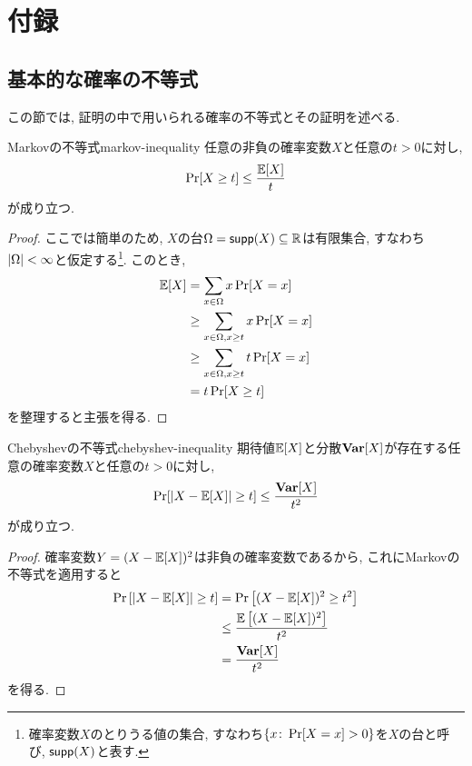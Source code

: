 \chapter{付録}

\section{基本的な確率の不等式}
この節では, 証明の中で用いられる確率の不等式とその証明を述べる.
\begin{lemma}{Markovの不等式}{markov-inequality}
  任意の非負の確率変数$X$と任意の$t>0$に対し,
  \begin{align*}
    \Pr[X\ge t] \le \frac{\operatorname*{\mathbb{E}}[X]}{t}
  \end{align*}
  が成り立つ.
\end{lemma}

\begin{proof}
  ここでは簡単のため, $X$の台$\Omega=\mathsf{supp}(X)\subseteq\mathbb{R}$は有限集合, すなわち$\abs{\Omega}<\infty$と仮定する\footnote{確率変数$X$のとりうる値の集合, すなわち$\qty{x\colon \Pr[X=x]>0}$を$X$の台と呼び, $\mathsf{supp}(X)$と表す.}.
  このとき,
  \begin{align*}
    \operatorname*{\mathbb{E}}[X] &= \sum_{x\in \Omega} x\Pr[X=x] \\
    &\ge \sum_{x\in \Omega,x\ge t} x\Pr[X=x] \\
    &\ge \sum_{x\in \Omega,x\ge t} t\Pr[X=x] \\
    &= t\Pr[X\ge t]
  \end{align*}
  を整理すると主張を得る.
\end{proof}

\begin{lemma}{Chebyshevの不等式}{chebyshev-inequality}
  期待値$\operatorname*{\mathbb{E}}[X]$と分散$\operatorname*{\mathbf{Var}}[X]$が存在する任意の確率変数$X$と任意の$t>0$に対し,
  \begin{align*}
    \Pr[|X-\operatorname*{\mathbb{E}}[X]|\ge t] \le \frac{\operatorname*{\mathbf{Var}}[X]}{t^2}
  \end{align*}
  が成り立つ.
\end{lemma}
\begin{proof}
  確率変数$Y=(X-\operatorname*{\mathbb{E}}[X])^2$は非負の確率変数であるから, これにMarkovの不等式を適用すると
  \begin{align*}
    \Pr\qty[ \abs{X - \operatorname*{\mathbb{E}}[X]} \ge t  ] &= \Pr\qty[ (X-\operatorname*{\mathbb{E}}[X])^2 \ge t^2 ] \\
    &\le \frac{\operatorname*{\mathbb{E}}\qty[ (X-\operatorname*{\mathbb{E}}[X])^2 ]}{t^2} \\
    & = \frac{\operatorname*{\mathbf{Var}}[X]}{t^2}
  \end{align*}
  を得る.
\end{proof}

